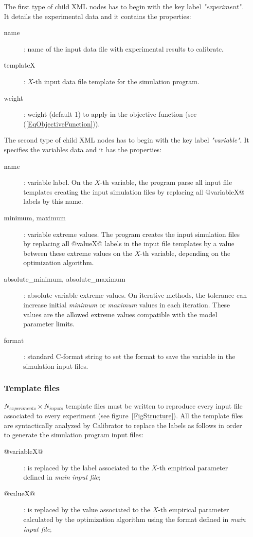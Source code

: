 \documentclass[review,authoryear]{elsarticle}
\begin{document}
The first type of child XML nodes has to begin with the key label
\emph{"experiment"}. It details the experimental data and it contains the properties:
\begin{description}
	\item[name]: name of the input data file with experimental results to calibrate.
	\item[templateX]: $X$-th input data file template for the simulation program.
	\item[weight]: weight (default 1) to apply in the objective function (see (\ref{EqObjectiveFunction})).
\end{description}

The second type of child XML nodes has to begin with the key label
\emph{"variable"}. It specifies the variables data and it has the properties:
\begin{description}
	\item[name]: variable label. On the $X$-th variable, the program parse all input
file templates creating the input simulation files by replacing all
@variableX@ labels by this name.
\item[minimum, maximum]: variable extreme values. The program creates the input
simulation files by replacing all @valueX@ labels in the input file templates
by a value between these extreme values on the $X$-th variable, depending on the
optimization algorithm.
\item[absolute\_minimum, absolute\_maximum]: absolute variable extreme values.
On iterative methods, the tolerance can increase initial \emph{minimum} or
\emph{maximum} values in each iteration. These values are the allowed extreme values
compatible with the model parameter limits.
\item[format]: standard C-format string to set the format to save the variable
in the simulation input files.
\end{description}

\subsubsection{Template files}

$N_{experiments}\times N_{inputs}$
template files must be written to reproduce every input file associated to every experiment (see figure~\ref{FigStructure}). All the template files are syntactically analyzed by Calibrator to replace the labels as follows in order to generate the simulation program input files:
\begin{description}
\item[@variableX@]: is replaced by the label associated to the $X$-th empirical parameter defined in \emph{main input file};
\item[@valueX@]: is replaced by the value associated to the $X$-th empirical parameter calculated by the optimization algorithm using the format defined in \emph{main input file};
\end{description}
\end{document}
